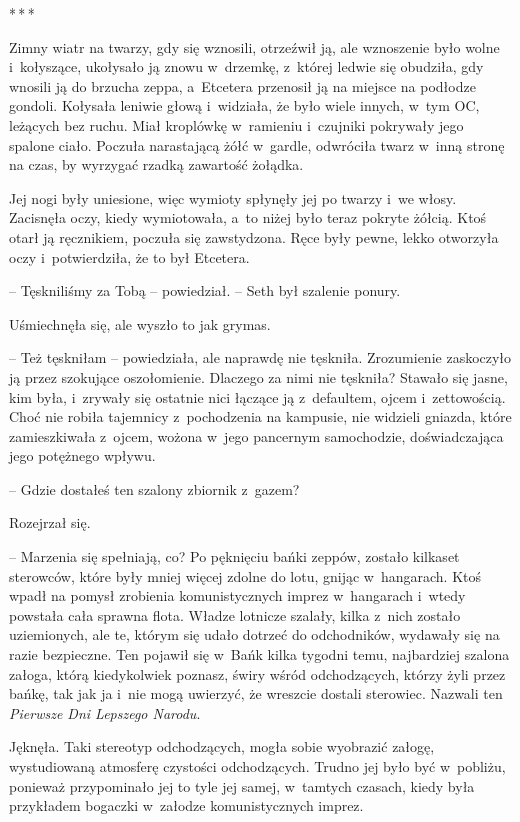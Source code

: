 \documentclass[oneside,polish,11pt,sfheadings]{mwbk}
\newcommand{\threeast}{\bigskip\par\centerline{*\,*\,*}\medskip\par}
\begin{document}
\threeast

Zimny wiatr na twarzy, gdy się wznosili, otrzeźwił ją, ale wznoszenie
było wolne i~kołyszące, ukołysało ją znowu w~drzemkę, z~której ledwie
się obudziła, gdy wnosili ją do brzucha zeppa, a~Etcetera przenosił ją
na miejsce na podłodze gondoli. Kołysała leniwie głową i~widziała, że
było wiele innych, w~tym OC, leżących bez ruchu. Miał kroplówkę w~ramieniu i~czujniki pokrywały jego spalone ciało. Poczuła narastającą
żółć w~gardle, odwróciła twarz w~inną stronę na czas, by wyrzygać rzadką
zawartość żołądka.

Jej nogi były uniesione, więc wymioty spłynęły jej po twarzy i~we włosy.
Zacisnęła oczy, kiedy wymiotowała, a~to niżej było teraz pokryte żółcią.
Ktoś otarł ją ręcznikiem, poczuła się zawstydzona. Ręce były pewne,
lekko otworzyła oczy i~potwierdziła, że to był Etcetera.

-- Tęskniliśmy za Tobą -- powiedział. -- Seth był szalenie ponury.

Uśmiechnęła się, ale wyszło to jak grymas. 

-- Też tęskniłam -- powiedziała, ale naprawdę nie tęskniła. Zrozumienie zaskoczyło ją przez
szokujące oszołomienie. Dlaczego za nimi nie tęskniła? Stawało się
jasne, kim była, i~zrywały się ostatnie nici łączące ją z~defaultem,
ojcem i~zettowością. Choć nie robiła tajemnicy z~pochodzenia na
kampusie, nie widzieli gniazda, które zamieszkiwała z~ojcem, wożona w~jego pancernym samochodzie, doświadczająca jego potężnego wpływu.

-- Gdzie dostałeś ten szalony zbiornik z~gazem?

Rozejrzał się. 

-- Marzenia się spełniają, co? Po pęknięciu bańki zeppów,
zostało kilkaset sterowców, które były mniej więcej zdolne do lotu,
gnijąc w~hangarach. Ktoś wpadł na pomysł zrobienia komunistycznych
imprez w~hangarach i~wtedy powstała cała sprawna flota. Władze lotnicze
szalały, kilka z~nich zostało uziemionych, ale te, którym się udało
dotrzeć do odchodników, wydawały się na razie bezpieczne. Ten pojawił
się w~Bańk kilka tygodni temu, najbardziej szalona załoga, którą
kiedykolwiek poznasz, świry wśród odchodzących, którzy żyli przez bańkę,
tak jak ja i~nie mogą uwierzyć, że wreszcie dostali sterowiec. Nazwali
ten \textit{Pierwsze Dni Lepszego Narodu}.

Jęknęła. Taki stereotyp odchodzących, mogła sobie wyobrazić załogę,
wystudiowaną atmosferę czystości odchodzących. Trudno jej było być w~pobliżu, ponieważ przypominało jej to tyle jej samej, w~tamtych czasach,
kiedy była przykładem bogaczki w~załodze komunistycznych imprez.
\end{document}
